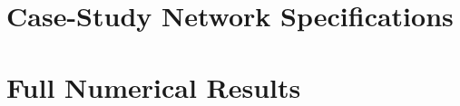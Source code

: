 \documentclass[a4paper,oneside,11pt]{book}
\begin{document}

\begin{appendices}

\chapter{Case-Study Network Specifications}
\label{app:network-specs}


\chapter{Full Numerical Results}
\label{app:full-results}


\end{appendices}

\printbibliography[heading=bibintoc]
\end{document}
